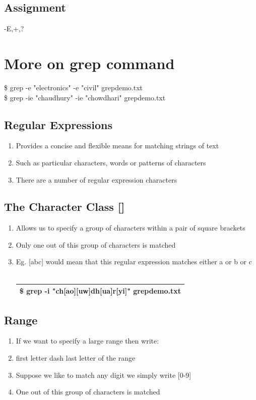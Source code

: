 \documentclass[12pt, a4paper]{report}
\begin{document}
\section{Assignment}
-E,+,?
\chapter{More on grep command}
\$ grep -e "electronics" -e "civil" grepdemo.txt\\
\$ grep -ie "chaudhury" -ie "chowdhari" grepdemo.txt
\section{Regular Expressions}
\begin{enumerate}
\item Provides a concise and flexible means for matching strings of text
\item Such as particular characters, words or patterns of characters	
\item There are a number of regular expression characters
\end{enumerate}
\section{The Character Class []}
\begin{enumerate}
\item Allows us to specify a group of characters within a pair of square brackets
\item Only one out of this group of characters is matched
\item Eg. [abc] would mean that this regular expression matches either a or b or c\\
\\
\begin{tabular}{|l|}\hline
\$ grep -i "ch[ao][uw]dh[ua]r[yi]" grepdemo.txt\\ \hline
\end{tabular}
\end{enumerate}
\section{Range}
\begin{enumerate}
\item If we want to specify a large range then write:
\item first letter dash last letter of the range
\item Suppose we like to match any digit we simply write [0-9]
\item One out of this group of characters is matched
\end{enumerate}
\end{document}

